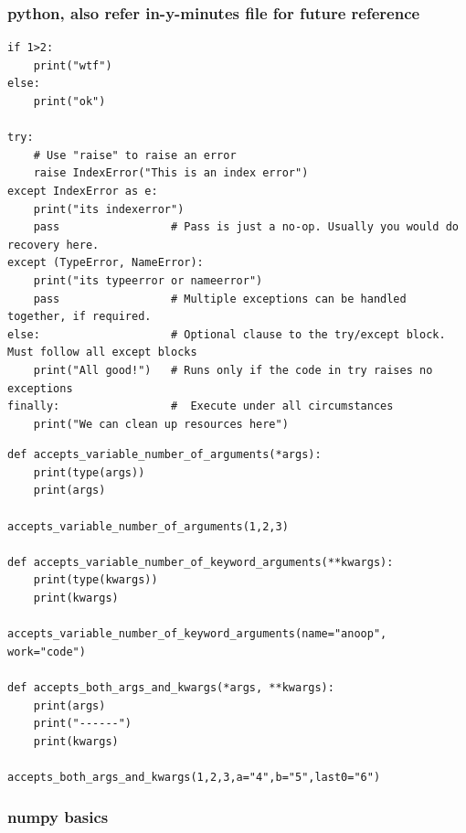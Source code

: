 \documentclass[11pt]{article}
\begin{document}
\subsubsection{python, also refer in-y-minutes file for future reference}
\label{sec:orgf681f54}
\begin{verbatim}
if 1>2:
    print("wtf")
else:
    print("ok")

try:
    # Use "raise" to raise an error
    raise IndexError("This is an index error")
except IndexError as e:
    print("its indexerror")
    pass                 # Pass is just a no-op. Usually you would do recovery here.
except (TypeError, NameError):
    print("its typeerror or nameerror")
    pass                 # Multiple exceptions can be handled together, if required.
else:                    # Optional clause to the try/except block. Must follow all except blocks
    print("All good!")   # Runs only if the code in try raises no exceptions
finally:                 #  Execute under all circumstances
    print("We can clean up resources here")
\end{verbatim}

\begin{verbatim}
def accepts_variable_number_of_arguments(*args):
    print(type(args))
    print(args)

accepts_variable_number_of_arguments(1,2,3)

def accepts_variable_number_of_keyword_arguments(**kwargs):
    print(type(kwargs))
    print(kwargs)

accepts_variable_number_of_keyword_arguments(name="anoop", work="code")

def accepts_both_args_and_kwargs(*args, **kwargs):
    print(args)
    print("------")
    print(kwargs)

accepts_both_args_and_kwargs(1,2,3,a="4",b="5",last0="6")
\end{verbatim}

\subsubsection{numpy basics}
\label{sec:org949b7c8}
\end{document}
